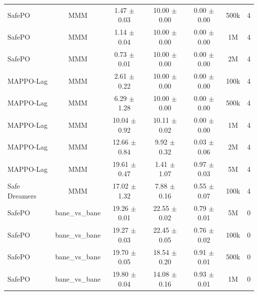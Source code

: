 \documentclass{article}
\begin{document}
\begin{longtable}{lcccccc}
SafePO & MMM & \textcolor{green!60!black}{1.47 $\pm$ 0.03} & \textcolor{green!60!black}{1\textcolor{green!60!black}{0.00 $\pm$ 0.00}} & 0.00 $\pm$ 0.00 & 500k & 4 \\
SafePO & MMM & \textcolor{green!60!black}{1.14 $\pm$ 0.04} & \textcolor{green!60!black}{1\textcolor{green!60!black}{0.00 $\pm$ 0.00}} & 0.00 $\pm$ 0.00 & 1M & 4 \\
SafePO & MMM & \textcolor{green!60!black}{0.73 $\pm$ 0.01} & \textcolor{green!60!black}{1\textcolor{green!60!black}{0.00 $\pm$ 0.00}} & 0.00 $\pm$ 0.00 & 2M & 4 \\
MAPPO-Lag & MMM & \textcolor{green!60!black}{2.61 $\pm$ 0.22} & \textcolor{green!60!black}{1\textcolor{green!60!black}{0.00 $\pm$ 0.00}} & 0.00 $\pm$ 0.00 & 100k & 4 \\
MAPPO-Lag & MMM & \textcolor{green!60!black}{6.29 $\pm$ 1.28} & \textcolor{green!60!black}{1\textcolor{green!60!black}{0.00 $\pm$ 0.00}} & 0.00 $\pm$ 0.00 & 500k & 4 \\
MAPPO-Lag & MMM & \textcolor{green!60!black}{10.04 $\pm$ 0.92} & \textcolor{green!60!black}{10.11 $\pm$ 0.02} & \textcolor{green!60!black}{0.00 $\pm$ 0.00} & 1M & 4 \\
MAPPO-Lag & MMM & \textcolor{green!60!black}{12.66 $\pm$ 0.84} & \textcolor{green!60!black}{9.92 $\pm$ 0.32} & \textcolor{green!60!black}{0.03 $\pm$ 0.06} & 2M & 4 \\
MAPPO-Lag & MMM & \textcolor{red!70!black}{19.61 $\pm$ 0.47} & \textcolor{red!70!black}{1.41 $\pm$ 1.07} & \textcolor{red!70!black}{0.97 $\pm$ 0.03} & 5M & 4 \\
Safe Dreamers & MMM & 17.02 $\pm$ 1.32 & 7.88 $\pm$ 0.16 & 0.55 $\pm$ 0.07 & 100k & 4 \\
\midrule
SafePO & bane\_vs\_bane & \textcolor{red!70!black}{19.26 $\pm$ 0.01} & \textcolor{green!60!black}{22.55 $\pm$ 0.02} & \textcolor{red!70!black}{0.79 $\pm$ 0.01} & 5M & 0 \\
SafePO & bane\_vs\_bane & \textcolor{red!70!black}{19.27 $\pm$ 0.03} & \textcolor{green!60!black}{22.45 $\pm$ 0.05} & \textcolor{red!70!black}{0.76 $\pm$ 0.02} & 100k & 0 \\
SafePO & bane\_vs\_bane & \textcolor{red!70!black}{19.70 $\pm$ 0.05} & \textcolor{green!60!black}{18.54 $\pm$ 0.20} & \textcolor{red!70!black}{0.91 $\pm$ 0.01} & 500k & 0 \\
SafePO & bane\_vs\_bane & \textcolor{red!70!black}{19.80 $\pm$ 0.04} & \textcolor{green!60!black}{14.08 $\pm$ 0.16} & \textcolor{red!70!black}{0.93 $\pm$ 0.01} & 1M & 0 \\

\end{longtable}
\end{document}
